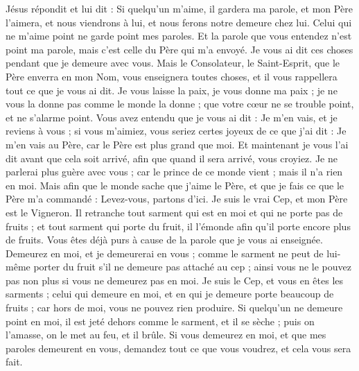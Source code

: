 \begin{multicols}{2}
Jésus répondit et lui dit : Si quelqu'un m'aime, il gardera ma parole, et mon Père l'aimera, et nous viendrons à lui, et nous ferons notre demeure chez lui.
Celui qui ne m'aime point ne garde point mes paroles. Et la parole que vous entendez n'est point ma parole, mais c'est celle du Père qui m'a envoyé.
Je vous ai dit ces choses pendant que je demeure avec vous.
Mais le Consolateur, le Saint-Esprit, que le Père enverra en mon Nom, vous enseignera toutes choses, et il vous rappellera tout ce que je vous ai dit.
Je vous laisse la paix, je vous donne ma paix ; je ne vous la donne pas comme le monde la donne ; que votre cœur ne se trouble point, et ne s'alarme point.
Vous avez entendu que je vous ai dit : Je m'en vais, et je reviens à vous ; si vous m'aimiez, vous seriez certes joyeux de ce que j'ai dit : Je m'en vais au Père, car le Père est plus grand que moi.
Et maintenant je vous l'ai dit avant que cela soit arrivé, afin que quand il sera arrivé, vous croyiez.
Je ne parlerai plus guère avec vous ; car le prince de ce monde vient ; mais il n'a rien en moi.
Mais afin que le monde sache que j'aime le Père, et que je fais ce que le Père m'a commandé : Levez-vous, partons d'ici.
\VerseOne{}Je suis le vrai Cep, et mon Père est le Vigneron.
Il retranche tout sarment qui est en moi et qui ne porte pas de fruits ; et tout sarment qui porte du fruit, il l'émonde afin qu'il porte encore plus de fruits.
Vous êtes déjà purs à cause de la parole que je vous ai enseignée.
Demeurez en moi, et je demeurerai en vous ; comme le sarment ne peut de lui-même porter du fruit s'il ne demeure pas attaché au cep ; ainsi vous ne le pouvez pas non plus si vous ne demeurez pas en moi.
Je suis le Cep, et vous en êtes les sarments ; celui qui demeure en moi, et en qui je demeure porte beaucoup de fruits ; car hors de moi, vous ne pouvez rien produire.
Si quelqu'un ne demeure point en moi, il est jeté dehors comme le sarment, et il se sèche ; puis on l'amasse, on le met au feu, et il brûle.
Si vous demeurez en moi, et que mes paroles demeurent en vous, demandez tout ce que vous voudrez, et cela vous sera fait.

\end{multicols}
